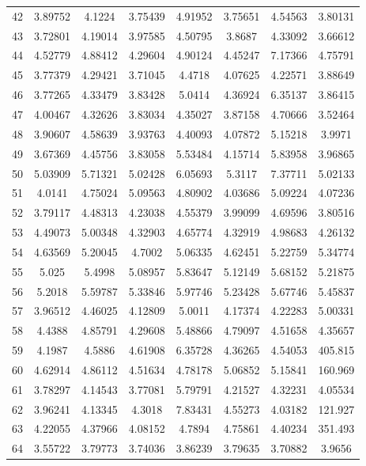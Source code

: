 \begin{center}
\begin{longtable}{cccccccc}
42 & 3.89752 & 4.1224 & 3.75439 & 4.91952 & 3.75651 & 4.54563 & 3.80131\\
43 & 3.72801 & 4.19014 & 3.97585 & 4.50795 & 3.8687 & 4.33092 & 3.66612\\
44 & 4.52779 & 4.88412 & 4.29604 & 4.90124 & 4.45247 & 7.17366 & 4.75791\\
45 & 3.77379 & 4.29421 & 3.71045 & 4.4718 & 4.07625 & 4.22571 & 3.88649\\
46 & 3.77265 & 4.33479 & 3.83428 & 5.0414 & 4.36924 & 6.35137 & 3.86415\\
47 & 4.00467 & 4.32626 & 3.83034 & 4.35027 & 3.87158 & 4.70666 & 3.52464\\
48 & 3.90607 & 4.58639 & 3.93763 & 4.40093 & 4.07872 & 5.15218 & 3.9971\\
49 & 3.67369 & 4.45756 & 3.83058 & 5.53484 & 4.15714 & 5.83958 & 3.96865\\
50 & 5.03909 & 5.71321 & 5.02428 & 6.05693 & 5.3117 & 7.37711 & 5.02133\\
51 & 4.0141 & 4.75024 & 5.09563 & 4.80902 & 4.03686 & 5.09224 & 4.07236\\
52 & 3.79117 & 4.48313 & 4.23038 & 4.55379 & 3.99099 & 4.69596 & 3.80516\\
53 & 4.49073 & 5.00348 & 4.32903 & 4.65774 & 4.32919 & 4.98683 & 4.26132\\
54 & 4.63569 & 5.20045 & 4.7002 & 5.06335 & 4.62451 & 5.22759 & 5.34774\\
55 & 5.025 & 5.4998 & 5.08957 & 5.83647 & 5.12149 & 5.68152 & 5.21875\\
56 & 5.2018 & 5.59787 & 5.33846 & 5.97746 & 5.23428 & 5.67746 & 5.45837\\
57 & 3.96512 & 4.46025 & 4.12809 & 5.0011 & 4.17374 & 4.22283 & 5.00331\\
58 & 4.4388 & 4.85791 & 4.29608 & 5.48866 & 4.79097 & 4.51658 & 4.35657\\
59 & 4.1987 & 4.5886 & 4.61908 & 6.35728 & 4.36265 & 4.54053 & 405.815\\
60 & 4.62914 & 4.86112 & 4.51634 & 4.78178 & 5.06852 & 5.15841 & 160.969\\
61 & 3.78297 & 4.14543 & 3.77081 & 5.79791 & 4.21527 & 4.32231 & 4.05534\\
62 & 3.96241 & 4.13345 & 4.3018 & 7.83431 & 4.55273 & 4.03182 & 121.927\\
63 & 4.22055 & 4.37966 & 4.08152 & 4.7894 & 4.75861 & 4.40234 & 351.493\\
64 & 3.55722 & 3.79773 & 3.74036 & 3.86239 & 3.79635 & 3.70882 & 3.9656\\

\end{longtable}
\end{center}
